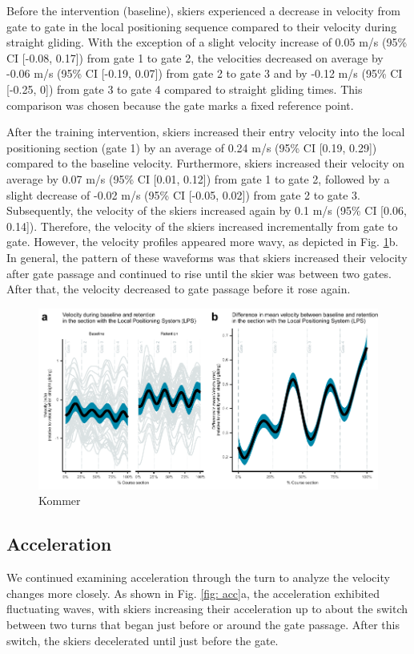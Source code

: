 \documentclass{article}
\begin{document}
Before the intervention (baseline), skiers experienced a decrease in velocity from gate to gate in the local positioning sequence compared to their velocity during straight gliding. With the exception of a slight velocity increase of 0.05 m/s (95\% CI [-0.08, 0.17]) from gate 1 to gate 2, the velocities decreased on average by -0.06 m/s (95\% CI [-0.19, 0.07]) from gate 2 to gate 3 and by -0.12 m/s (95\% CI [-0.25, 0]) from gate 3 to gate 4 compared to straight gliding times. This comparison was chosen because the gate marks a fixed reference point.

After the training intervention, skiers increased their entry velocity into the local positioning section (gate 1) by an average of 0.24 m/s (95\% CI [0.19, 0.29]) compared to the baseline velocity. Furthermore, skiers increased their velocity on average by 0.07 m/s (95\% CI [0.01, 0.12]) from gate 1 to gate 2, followed by a slight decrease of -0.02 m/s (95\% CI [-0.05, 0.02]) from gate 2 to gate 3. Subsequently, the velocity of the skiers increased again by 0.1 m/s (95\% CI [0.06, 0.14]). Therefore, the velocity of the skiers increased incrementally from gate to gate. However, the velocity profiles appeared more wavy, as depicted in Fig. \ref{fig: velocity}b. In general, the pattern of these waveforms was that skiers increased their velocity after gate passage and continued to rise until the skier was between two gates. After that, the velocity decreased to gate passage before it rose again. 

\begin{figure}[H]
\centering
\includegraphics{figurer/figure_velocity_2.pdf}
\caption{Kommer}\label{fig: velocity}
\end{figure}

\subsection{Acceleration}
We continued examining acceleration through the turn to analyze the velocity changes more closely. As shown in Fig. \ref{fig: acc}a, the acceleration exhibited fluctuating waves, with skiers increasing their acceleration up to about the switch between two turns that began just before or around the gate passage. After this switch, the skiers decelerated until just before the gate. 
\end{document}
